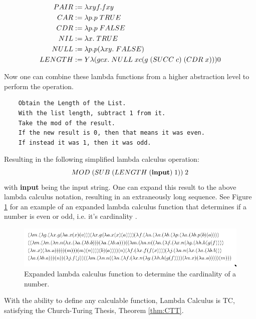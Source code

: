 \[\begin{aligned}
        PAIR &:= \lambda xyf. f x y\\
        CAR &:= \lambda p. p \hspace{0.1cm} TRUE\\
        CDR &:= \lambda p. p \hspace{0.1cm} FALSE\\
        NIL &:= \lambda x. \hspace{0.1cm} TRUE\\
        NULL &:= \lambda p. p (\lambda xy. \hspace{0.1cm} FALSE)\\
        LENGTH &:= Y \lambda (gcx. \hspace{0.1cm} NULL \hspace{0.1cm} x c (g \hspace{0.1cm} (SUCC \hspace{0.1cm} c) \hspace{0.1cm} (CDR \hspace{0.1cm} x))) 0\\
    \end{aligned}
\]

Now one can combine these lambda functions from a higher abstraction level to perform the operation.

\begin{verbatim}
    Obtain the Length of the List.
    With the list length, subtract 1 from it.
    Take the mod of the result.
    If the new result is 0, then that means it was even.
    If instead it was 1, then it was odd.
\end{verbatim}

Resulting in the following simplified lambda calculus operation:\[MOD \hspace{0.1cm} (SUB \hspace{0.1cm} (LENGTH \hspace{0.1cm} (\textbf{input}) \hspace{0.1cm} 1)) \hspace{0.1cm} 2\]
with \textbf{input} being the input string.
One can expand this result to the above lambda calculus notation, resulting in an extraneously long sequence.
See Figure \ref{fig:OddEvenLambda} for an example of an expanded lambda calculus function that determines if a number is even or odd, i.e. it's cardinality \cite{RedditLambdaCalcPost,RedditLambdaCalcComment}.

\begin{figure}[htb]
    \centering
    \includegraphics[width=16cm]{Images/oddevenlambda.png}
       \caption{Expanded lambda calculus function to determine the cardinality of a number.}
           \label{fig:OddEvenLambda}
\end{figure}

With the ability to define any calculable function, Lambda Calculus is TC, satisfying the Church-Turing Thesis, Theorem \ref{thm:CTT}.
